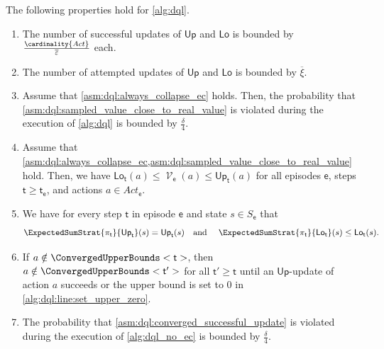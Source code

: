 \documentclass{article}
\newcommand{\States}{S}
\newcommand{\Actions}{Act}
\newcommand{\strategy}{\pi}
\DeclareMathOperator{\val}{\mathcal{V}}
\newcommand{\upperbound}{\mathsf{Up}}
\newcommand{\lowerbound}{\mathsf{Lo}}
\newcommand{\updatestep}{{\overline{\varepsilon}}}
\newcommand{\updatecount}{{\overline{\xi}}}
\newcommand{\algostep}{\mathsf{t}}
\newcommand{\algoepisode}{\mathsf{e}}
\begin{document}
\begin{lemma} \label{stm:dql:properties}
	The following properties hold for \cref{alg:dql}.
	\begin{enumerate}
		\item \label{item:stm:dql:properties:success_updates}
		The number of successful updates of $\upperbound$ and $\lowerbound$ is bounded by $\frac{\cardinality{\Actions}}{\updatestep}$ each.

		\item \label{item:stm:dql:properties:attempted_updates}
		The number of attempted updates of $\upperbound$ and $\lowerbound$ is bounded by $\updatecount$.

		\item \label{item:stm:dql:properties:sampled_value_close_to_real_value_probability}
		Assume that \cref{asm:dql:always_collapse_ec} holds.
		Then, the probability that \cref{asm:dql:sampled_value_close_to_real_value} is violated during the execution of \cref{alg:dql} is bounded by $\frac{\delta}{4}$.

		\item \label{item:stm:dql:properties:bounds_ordered}
		Assume that \cref{asm:dql:always_collapse_ec,asm:dql:sampled_value_close_to_real_value} hold.
		Then, we have $\lowerbound_\algostep(a) \leq \val_\algoepisode(a) \leq \upperbound_\algostep(a)$ for all episodes $\algoepisode$, steps $\algostep \geq \algostep_\algoepisode$, and actions $a \in \Actions_\algoepisode$.

		\item \label{item:stm:dql:properties:strategy_bounds}
		We have for every step $\algostep$ in episode $\algoepisode$ and state $s \in \States_\algoepisode$ that
		\begin{equation*}
			\ExpectedSumStrat{\strategy_\algostep}{\upperbound_\algostep}(s) = \upperbound_\algostep(s) \text{\quad and \quad} \ExpectedSumStrat{\strategy_\algostep}{\lowerbound_\algostep}(s) \leq \lowerbound_\algostep(s).
		\end{equation*}

		\item \label{item:stm:dql:properties:update_succeeds}
		If $a \notin \ConvergedUpperBounds<\algostep>$, then $a \notin \ConvergedUpperBounds<\algostep'>$ for all $\algostep' \geq \algostep$ until an $\upperbound$-update of action $a$ succeeds or the upper bound is set to $0$ in \cref{alg:dql:line:set_upper_zero}.

		\item \label{item:stm:dql:properties:converged_successful_update_probability}
		The probability that \cref{asm:dql:converged_successful_update} is violated during the execution of \cref{alg:dql_no_ec} is bounded by $\frac{\delta}{4}$.


\end{enumerate}
\end{lemma}
\end{document}
